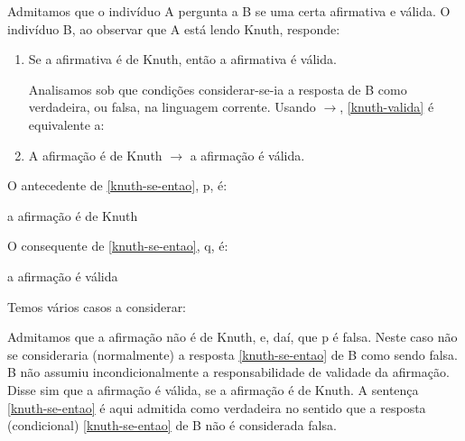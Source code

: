 \begin{enumerate}[label=\textbf{(\arabic*)}]
    \pagebreak

    Admitamos que o indivíduo A pergunta a B se uma certa afirmativa e válida.
    O indivíduo B, ao observar que A está lendo Knuth\footnotemark, responde:

    \begin{enumerate}[label=(\arabic*)]
        \item Se a afirmativa é de Knuth, então a afirmativa é válida. \label{knuth-valida}

        Analisamos sob que condições considerar-se-ia a resposta de B como verdadeira, ou falsa, na linguagem corrente.
        Usando $\to$, \ref{knuth-valida} é equivalente a:

        \item A afirmação é de Knuth $\to$ a afirmação é válida. \label{knuth-se-entao}
    \end{enumerate}

    O antecedente de \ref{knuth-se-entao}, p, é:

    \centerline{a afirmação é de Knuth}

    O consequente de \ref{knuth-se-entao}, q, é:

    \centerline{a afirmação é válida}

    Temos vários casos a considerar:


    Admitamos que a afirmação não é de Knuth, e, daí, que p é falsa.
    Neste caso não se consideraria (normalmente) a resposta \ref{knuth-se-entao} de B como sendo falsa.
    B não assumiu incondicionalmente a responsabilidade de validade da afirmação.
    Disse sim que a afirmação é válida, se a afirmação é de Knuth.
    A sentença \ref{knuth-se-entao} é aqui admitida como verdadeira no sentido que a resposta (condicional) \ref{knuth-se-entao} de B não é considerada falsa.


\end{enumerate}
